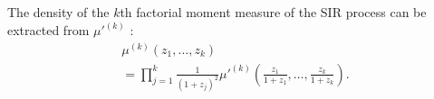 \documentclass[lettersize,journal]{IEEEtran}
\begin{document}
    The density of the $k$th factorial moment measure of the SIR process can be extracted from $\mu'^{(k)}$ \cite[Corollary 6.1.3]{alma998193414406526}:
    \begin{align}
      \label{eq:densitySINR}
      &\mu^{(k)}(z_1,\dots,z_k)&  \nonumber\\
     &= \prod_{j=1}^k\frac{1}{(1+z_j)^2}\mu'^{(k)}\left(\frac{z_1}{1+z_1},\dots,\frac{z_k}{1+z_k}\right).
    \end{align}


\end{document}
